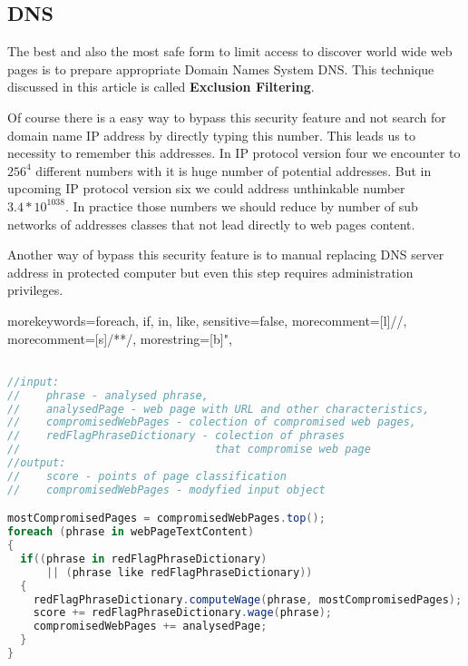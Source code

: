 \documentclass[9pt,a4paper]{extarticle}
\begin{document}
\begin{multicols}{2}
\section{DNS}
The best and also the most safe form to limit access to discover world wide web pages is to prepare appropriate Domain Names System DNS\cite{j._postel_domain_1984, p._mockapetris_domain_1987, p._mockapetris_domain2_1987, yakov_rekhter_dynamic_1997, r._elz_clarifications_1997, d._eastlake_3rd_domain_1997}. This technique discussed in this article is called \textbf{Exclusion Filtering}\cite{paul_greenfield_netalert_2001}.

Of course there is a easy way to bypass this security feature and not search for domain name IP address by directly typing this number. This leads us to necessity to remember this addresses. In IP protocol version four we encounter to \({256}^{4}\) different numbers with it is huge number of potential addresses. But in upcoming IP protocol version six we could address unthinkable number \(3.4*10^{1038}\). In practice those numbers we should reduce by number of sub networks of addresses classes that not lead directly to web pages content.

Another way of bypass this security feature is to manual replacing DNS server address in protected computer but even this step requires administration privileges.

\end{multicols}

%
 {morekeywords={foreach, if, in, like}, sensitive=false, morecomment=[l]{//}, morecomment=[s]{/*}{*/}, morestring=[b]", }
\lstset{
numbers=left, numberstyle=\tiny, stepnumber=1, numbersep=5pt
}
\begin{lstlisting}[title={Alg 1. The basic Internet web page classifier algorithm}, language=csharp, label=alg1] 

//input: 
//    phrase - analysed phrase, 
//    analysedPage - web page with URL and other characteristics, 
//    compromisedWebPages - colection of compromised web pages, 
//    redFlagPhraseDictionary - colection of phrases 
//                              that compromise web page
//output:
//    score - points of page classification
//    compromisedWebPages - modyfied input object

mostCompromisedPages = compromisedWebPages.top();
foreach (phrase in webPageTextContent)
{  
  if((phrase in redFlagPhraseDictionary) 
      || (phrase like redFlagPhraseDictionary))
  {
    redFlagPhraseDictionary.computeWage(phrase, mostCompromisedPages);
    score += redFlagPhraseDictionary.wage(phrase);
    compromisedWebPages += analysedPage;
  }
}
\end{lstlisting}
\end{document}
